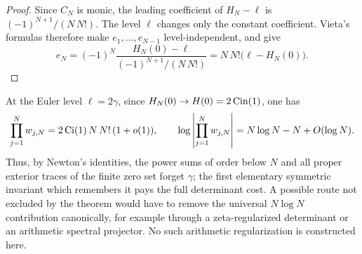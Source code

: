 \begin{proof}
Since $C_N$ is monic, the leading coefficient of $H_N-\ell$ is
$(-1)^{N+1}/(N\,N!)$.  The level $\ell$ changes only the constant
coefficient.  Vieta's formulas therefore make $e_1,\ldots,e_{N-1}$
level-independent, and give
\[
 e_N=(-1)^N
 \frac{H_N(0)-\ell}{(-1)^{N+1}/(N\,N!)}
 =N\,N!\bigl(\ell-H_N(0)\bigr).
\]
\end{proof}

At the Euler level $\ell=2\gamma$, since
$H_N(0)\to H(0)=2\operatorname{Cin}(1)$, one has
\[
 \prod_{j=1}^Nw_{j,N}=2\operatorname{Ci}(1)\,N\,N!\,(1+o(1)),
 \qquad
 \log\left|\prod_{j=1}^Nw_{j,N}\right|
 =N\log N-N+O(\log N).
\]
Thus, by Newton's identities, the power sums of order below $N$ and all
proper exterior traces of the finite zero set forget $\gamma$; the first
elementary symmetric invariant which
remembers it pays the full determinant cost.  A possible route not excluded
by the theorem
would have to remove the universal $N\log N$ contribution canonically, for
example through a zeta-regularized determinant or an arithmetic spectral
projector.  No such arithmetic regularization is constructed here.
